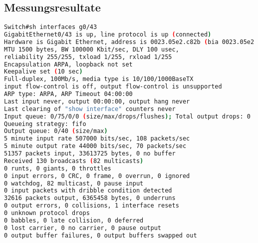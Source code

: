 \subsection{Messungsresultate}
\label{ssec:resultate}
\begin{lstlisting}[backgroundcolor = \color{snippetcolor},
language = bash,
xleftmargin = 0.5cm,
framexleftmargin = 0.1em,
breaklines=true]
Switch#sh interfaces g0/43
GigabitEthernet0/43 is up, line protocol is up (connected)
Hardware is Gigabit Ethernet, address is 0023.05e2.c82b (bia 0023.05e2.c82b)
MTU 1500 bytes, BW 100000 Kbit/sec, DLY 100 usec,
reliability 255/255, txload 1/255, rxload 1/255
Encapsulation ARPA, loopback not set
Keepalive set (10 sec)
Full-duplex, 100Mb/s, media type is 10/100/1000BaseTX
input flow-control is off, output flow-control is unsupported
ARP type: ARPA, ARP Timeout 04:00:00
Last input never, output 00:00:00, output hang never
Last clearing of "show interface" counters never
Input queue: 0/75/0/0 (size/max/drops/flushes); Total output drops: 0
Queueing strategy: fifo
Output queue: 0/40 (size/max)
5 minute input rate 507000 bits/sec, 108 packets/sec
5 minute output rate 44000 bits/sec, 70 packets/sec
51357 packets input, 33613725 bytes, 0 no buffer
Received 130 broadcasts (82 multicasts)
0 runts, 0 giants, 0 throttles
0 input errors, 0 CRC, 0 frame, 0 overrun, 0 ignored
0 watchdog, 82 multicast, 0 pause input
0 input packets with dribble condition detected
32616 packets output, 6365458 bytes, 0 underruns
0 output errors, 0 collisions, 1 interface resets
0 unknown protocol drops
0 babbles, 0 late collision, 0 deferred
0 lost carrier, 0 no carrier, 0 pause output
0 output buffer failures, 0 output buffers swapped out
\end{lstlisting}


